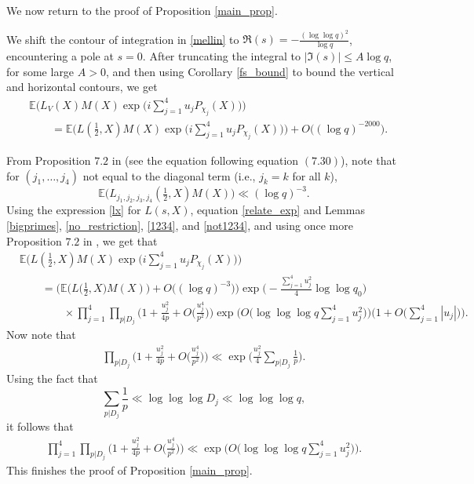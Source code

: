 \documentclass[12pt, reqno]{amsart}
\newcommand{\E}{\mathbb{E}}
\numberwithin{equation}{section}
\numberwithin{theorem}{section}
\numberwithin{equation}{section}
\begin{document}
We now return to the proof of Proposition \ref{main_prop}.

We shift the contour of integration in \eqref{mellin} to $\Re(s)= - \frac{ (\log \log q)^2}{\log q}$, encountering a pole at $s=0$. After truncating the integral to $|\Im(s)| \leq A \log q$, for some large $A>0$, and then using Corollary \ref{fs_bound} to bound the vertical and horizontal contours, we get
    \begin{align}
         &\E\Bigg( L_V(X) M(X) \exp\bigg(  i\sum_{j=1}^4 u_jP_{\chi_j}(X)\bigg)\Bigg) \nonumber \\
         &\qquad= \E \Bigg(L(\tfrac12,X)M(X) \exp\bigg(  i\sum_{j=1}^4 u_jP_{\chi_j}(X)\bigg) \Bigg) + O\big( (\log q)^{-2000}\big).\label{relate_exp}
    \end{align}
    
    From Proposition $7.2$ in \cite{BFM} (see the equation following equation $(7.30)$), note that for $(j_1,\ldots,j_4)$ not equal to the diagonal term (i.e., $j_k=k$ for all $k$), 
\begin{equation*}
    \E \Big( L_{j_1,j_2,j_3,j_4} ( \tfrac{1}{2},X  ) M(X)  \Big) \ll (\log q)^{-3}.
\end{equation*}Using the expression \eqref{lx} for $L(s,X)$, equation \eqref{relate_exp} and Lemmas \ref{bigprimes}, \ref{no_restriction}, \ref{1234}, and \ref{not1234}, and using once more Proposition $7.2$ in \cite{BFM}, we get that
\begin{align*}
    &\E  \Bigg(L(\tfrac12,X)M(X) \exp\bigg(  i\sum_{j=1}^4 u_jP_{\chi_j}(X)\bigg) \Bigg)\\
    &\qquad= \bigg( \E \Big(L\big(\tfrac12,X\big)M(X)\Big) + O\big(  (\log q)^{-3}\big) \bigg)\exp \Big(  - \frac{\sum_{j=1}^4 u_j^2}{4} \log \log q_0 \Big) \\
    &\qquad\qquad \times  \prod_{j=1}^4 \prod_{p|D_j} \bigg(  1+ \frac{u_j^2}{4p} + O \Big( \frac{u_j^4}{p^2} \Big)\bigg) \exp \bigg( O \Big(  \log \log \log q \sum_{j=1}^4 u_j^2\Big) \bigg)\bigg(1 +O \Big(  \sum_{j=1}^4 |u_j|\Big) \bigg).
\end{align*}
Now note that 
\begin{align*}
    \prod_{p|D_j} \bigg(  1+ \frac{u_j^2}{4p} + O \Big( \frac{u_j^4}{p^2} \Big)\bigg) \ll \exp \Big( \frac{u_j^2}{4} \sum_{p|D_j} \frac{1}{p} \Big).
\end{align*}
Using the fact that
$$ \sum_{p|D_j} \frac{1}{p} \ll \log \log \log D_j \ll \log \log \log q,$$ it follows that 
\begin{align*}
 \prod_{j=1}^4    \prod_{p|D_j} \bigg(  1+ \frac{u_j^2}{4p} + O \Big( \frac{u_j^4}{p^2} \Big)\bigg) \ll \exp \bigg( O \Big( \log \log \log q \sum_{j=1}^4 u_j^2\Big) \bigg).
 \end{align*}
This finishes the proof of Proposition \ref{main_prop}.
\end{document}
